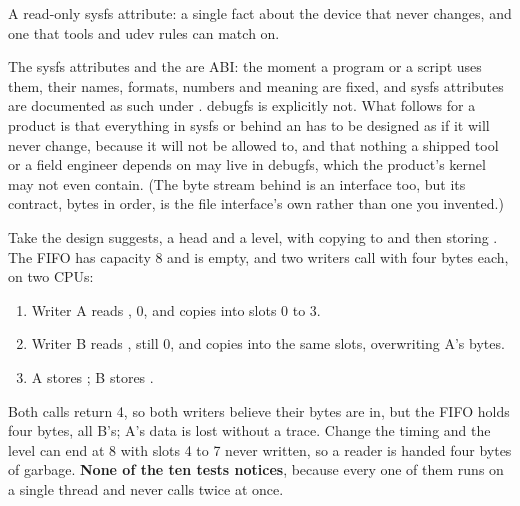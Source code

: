  A read-only sysfs attribute: a single fact about the device that never changes, and one
that tools and udev rules can match on.

 The sysfs attributes and the  are ABI: the moment a program or a script uses
them, their names, formats, numbers and meaning are fixed, and sysfs attributes are documented as
such under . debugfs is explicitly not. What follows for a product is that
everything in sysfs or behind an  has to be designed as if it will never change,
because it will not be allowed to, and that nothing a shipped tool or a field engineer depends on
may live in debugfs, which the product's kernel may not even contain. (The byte stream behind
 is an interface too, but its contract, bytes in order, is the file interface's own
rather than one you invented.)


 Take the design  suggests, a head and a level, with 
copying to  and then storing . The FIFO has
capacity 8 and is empty, and two writers call  with four bytes each, on two CPUs:
\begin{enumerate}
  \item Writer A reads , 0, and copies  into slots 0 to 3.
  \item Writer B reads , still 0, and copies  into the same slots,
    overwriting A's bytes.
  \item A stores ; B stores .
\end{enumerate}
Both calls return 4, so both writers believe their bytes are in, but the FIFO holds four bytes,
all B's; A's data is lost without a trace. Change the timing and the level can end at 8 with slots
4 to 7 never written, so a reader is handed four bytes of garbage. \textbf{None of the ten tests
notices}, because every one of them runs on a single thread and never calls 
twice at once.

